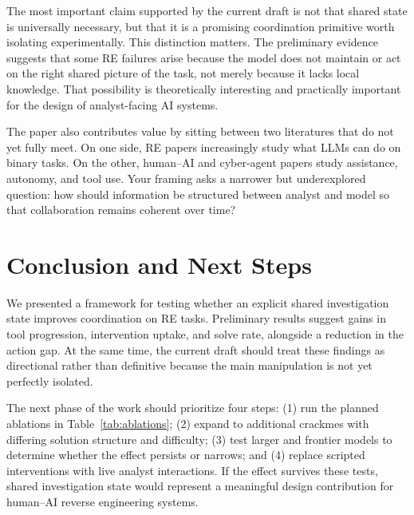 \documentclass[letterpaper]{article}
\begin{document}
The most important claim supported by the current draft is not that shared state is universally necessary, but that it is a promising coordination primitive worth isolating experimentally.
This distinction matters.
The preliminary evidence suggests that some RE failures arise because the model does not maintain or act on the right shared picture of the task, not merely because it lacks local knowledge.
That possibility is theoretically interesting and practically important for the design of analyst-facing AI systems.

The paper also contributes value by sitting between two literatures that do not yet fully meet.
On one side, RE papers increasingly study what LLMs can do on binary tasks.
On the other, human--AI and cyber-agent papers study assistance, autonomy, and tool use.
Your framing asks a narrower but underexplored question: how should information be structured between analyst and model so that collaboration remains coherent over time?

\section{Conclusion and Next Steps}

We presented a framework for testing whether an explicit shared investigation state improves coordination on RE tasks.
Preliminary results suggest gains in tool progression, intervention uptake, and solve rate, alongside a reduction in the action gap.
At the same time, the current draft should treat these findings as directional rather than definitive because the main manipulation is not yet perfectly isolated.

The next phase of the work should prioritize four steps: (1) run the planned ablations in Table~\ref{tab:ablations}; (2) expand to additional crackmes with differing solution structure and difficulty; (3) test larger and frontier models to determine whether the effect persists or narrows; and (4) replace scripted interventions with live analyst interactions.
If the effect survives these tests, shared investigation state would represent a meaningful design contribution for human--AI reverse engineering systems.


\end{document}
